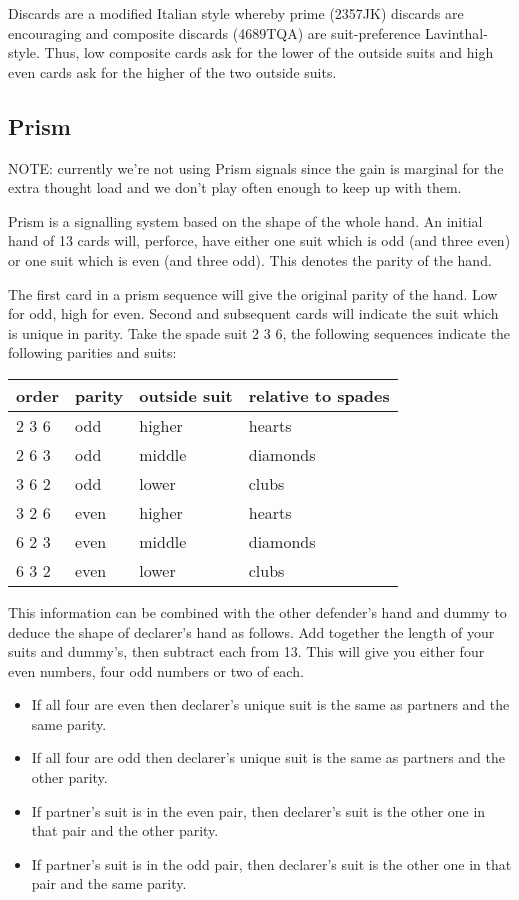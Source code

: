 \documentclass[a4paper,14pt]{extarticle}
\begin{document}
Discards are a modified Italian style whereby prime (2357JK) discards are
encouraging and composite discards (4689TQA) are suit-preference
Lavinthal-style. Thus, low composite cards ask for the lower of the outside
suits and high even cards ask for the higher of the two outside suits.

\newpage
\subsection{Prism}
\label{sec:card:prism}

NOTE: currently we're not using Prism signals since the gain is marginal for the 
extra thought load and we don't play often enough to keep up with them.

Prism is a signalling system based on the shape of the whole hand. An initial
hand of 13 cards will, perforce, have either one suit which is odd (and three
even) or one suit which is even (and three odd). This denotes the parity of the
hand.

The first card in a prism sequence will give the original parity of the hand.
Low for odd, high for even. Second and subsequent cards will indicate the suit
which is unique in parity. Take the spade suit 2 3 6, the following sequences indicate
the following parities and suits:

\begin{tabular}{llll}
\bf order & \bf parity & \bf outside suit & \bf relative to spades \\
\hline
2 3 6 & odd    & higher       & hearts \\
2 6 3 & odd    & middle       & diamonds \\
3 6 2 & odd    & lower        & clubs \\
3 2 6 & even   & higher       & hearts \\
6 2 3 & even   & middle       & diamonds \\
6 3 2 & even   & lower        & clubs \\
\end{tabular}

This information can be combined with the other defender's hand and dummy to
deduce the shape of declarer's hand as follows. Add together the length of your
suits and dummy's, then subtract each from 13. This will give you either four
even numbers, four odd numbers or two of each.

\begin{itemize}
\item If all four are even then declarer's unique suit is the same as partners and the same parity.
\item If all four are odd then declarer's unique suit is the same as partners and the other parity.
\item If partner's suit is in the even pair, then declarer's suit is the other one in that pair and the other parity.
\item If partner's suit is in the odd pair, then declarer's suit is the other one in that pair and the same parity.
\end{itemize}
\end{document}
